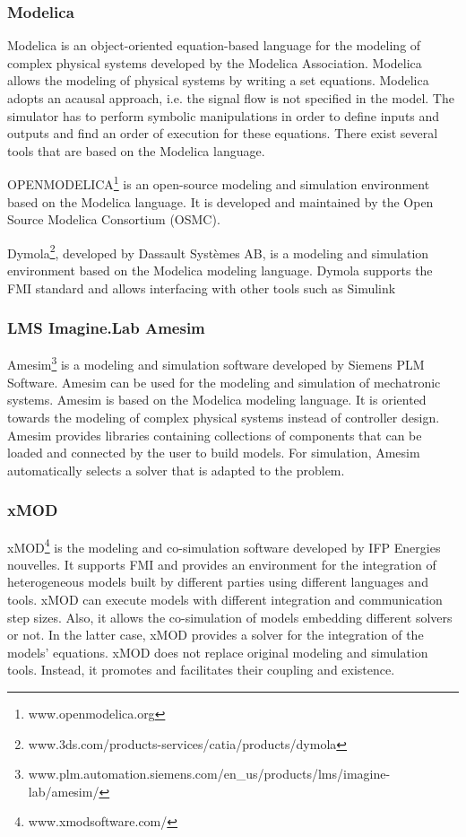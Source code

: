 \subsubsection{Modelica}
Modelica is an object-oriented equation-based language for the modeling of complex physical systems developed by the Modelica Association. Modelica allows the modeling of physical systems by writing a set equations. Modelica adopts an acausal approach, i.e. the signal flow is not specified in the model. The simulator has to perform symbolic manipulations in order to define inputs and outputs and find an order of execution for these equations. There exist several tools that are based on the Modelica language.

OPENMODELICA\footnote{www.openmodelica.org} is an open-source modeling and simulation environment based on the Modelica language. It is developed and maintained by the Open Source Modelica Consortium (OSMC).

Dymola\footnote{www.3ds.com/products-services/catia/products/dymola}, developed by Dassault Syst\`emes AB, is a modeling and simulation environment based on the Modelica modeling language. Dymola supports the FMI standard and allows interfacing with other tools such as Simulink

\subsubsection{LMS Imagine.Lab Amesim}
Amesim\footnote{www.plm.automation.siemens.com/en\_us/products/lms/imagine-lab/amesim/} is a modeling and simulation software developed by Siemens PLM Software. Amesim can be used for the modeling and simulation of mechatronic systems. Amesim is based on the Modelica modeling language. It is oriented towards the modeling of complex physical systems instead of controller design. Amesim provides libraries containing collections of components that can be loaded and connected by the user to build models. For simulation, Amesim automatically selects a solver that is adapted to the problem.

\subsubsection{xMOD}
xMOD\footnote{www.xmodsoftware.com/} is the modeling and co-simulation software developed by IFP Energies nouvelles. It supports FMI and provides an environment for the integration of heterogeneous models built by different parties using different languages and tools. xMOD can execute models with different integration and communication step sizes. Also, it allows the co-simulation of models embedding different solvers or not. In the latter case, xMOD provides a solver for the integration of the models' equations. xMOD does not replace original modeling and simulation tools. Instead, it promotes and facilitates their coupling and existence.

